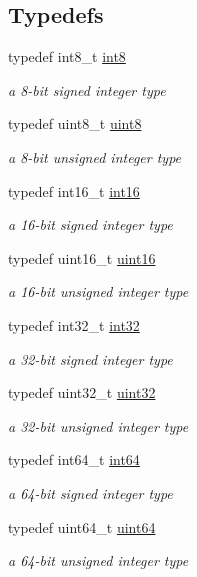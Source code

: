 \subsection*{Typedefs}
\begin{DoxyCompactItemize}
\item 
typedef int8\+\_\+t \hyperlink{namespacechaos_a56015674cfe4ad1fc583c3da6c724d8a}{int8}
\begin{DoxyCompactList}\small\item\em a 8-\/bit signed integer type \end{DoxyCompactList}\item 
typedef uint8\+\_\+t \hyperlink{namespacechaos_a229e18634387996c2712d57f184bf363}{uint8}
\begin{DoxyCompactList}\small\item\em a 8-\/bit unsigned integer type \end{DoxyCompactList}\item 
typedef int16\+\_\+t \hyperlink{namespacechaos_a23112b8188c8a6ad32a86041fb4c088e}{int16}
\begin{DoxyCompactList}\small\item\em a 16-\/bit signed integer type \end{DoxyCompactList}\item 
typedef uint16\+\_\+t \hyperlink{namespacechaos_ac3888b1c9e56da7fbbdb3ab8425b4068}{uint16}
\begin{DoxyCompactList}\small\item\em a 16-\/bit unsigned integer type \end{DoxyCompactList}\item 
typedef int32\+\_\+t \hyperlink{namespacechaos_ad1de7efb430365afd2c9446a0f522a90}{int32}
\begin{DoxyCompactList}\small\item\em a 32-\/bit signed integer type \end{DoxyCompactList}\item 
typedef uint32\+\_\+t \hyperlink{namespacechaos_a3b3a47ba1e284655bf1a30c441121c60}{uint32}
\begin{DoxyCompactList}\small\item\em a 32-\/bit unsigned integer type \end{DoxyCompactList}\item 
typedef int64\+\_\+t \hyperlink{namespacechaos_a46c61f58d99879b936f58234b9a05e0c}{int64}
\begin{DoxyCompactList}\small\item\em a 64-\/bit signed integer type \end{DoxyCompactList}\item 
typedef uint64\+\_\+t \hyperlink{namespacechaos_a34fe5f5bfc3ef6d80b5d094ed91b4d6e}{uint64}
\begin{DoxyCompactList}\small\item\em a 64-\/bit unsigned integer type \end{DoxyCompactList}\end{DoxyCompactItemize}


